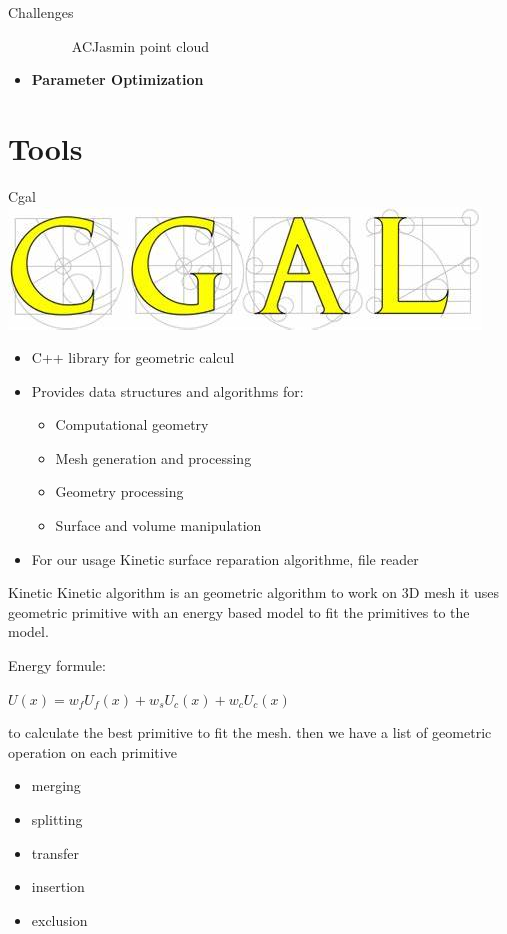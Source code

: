 \documentclass[10pt]{beamer}
\begin{document}
\begin{frame}{Challenges}
\begin{itemize}
\begin{figure}[H]
\begin{minipage}[t]{0.20\textwidth}
          \caption*{ACJasmin point cloud}
        \end{minipage}
\end{figure}
    \item \textbf{Parameter Optimization}
\end{itemize}
\end{frame}

\section{Tools}
\begin{frame}{Cgal}
    \includegraphics[scale = 0.2]{../../images/CGAL_logo.png}
    \begin{itemize}
        \item C++ library for geometric calcul 
        \item Provides data structures and algorithms for:
        \begin{itemize}
            \item Computational geometry
            \item Mesh generation and processing
            \item Geometry processing
            \item Surface and volume manipulation
        \end{itemize}
        \item For our usage Kinetic surface reparation algorithme, file reader
    \end{itemize}

\end{frame}{Kinetic}
Kinetic algorithm is an geometric algorithm to work on 3D mesh it uses  geometric primitive with an energy based model to fit the primitives to the model.

Energy formule: 
\newline
\begin{center}
    $        U(x) = w_f U_f(x) + w_s U_c(x) + w_c U_c(x)       $
\end{center}

to calculate the best primitive to fit the mesh.
then we have a list of geometric operation on each primitive
\begin{itemize}
    \item merging
    \item splitting 
    \item transfer 
    \item insertion
    \item exclusion
\end{itemize}
\end{document}
